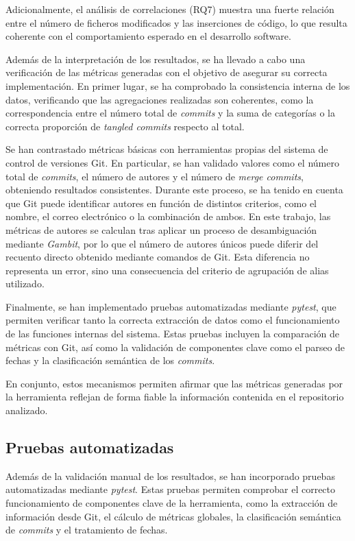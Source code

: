 \documentclass[a4paper, 12pt]{book}
\begin{document}
Adicionalmente, el análisis de correlaciones (RQ7) muestra una fuerte relación entre el número de ficheros modificados y las inserciones de código, lo que resulta coherente con el comportamiento esperado en el desarrollo software.

Además de la interpretación de los resultados, se ha llevado a cabo una verificación de las métricas generadas con el objetivo de asegurar su correcta implementación. En primer lugar, se ha comprobado la consistencia interna de los datos, verificando que las agregaciones realizadas son coherentes, como la correspondencia entre el número total de \emph{commits} y la suma de categorías o la correcta proporción de \emph{tangled commits} respecto al total.

Se han contrastado métricas básicas con herramientas propias del sistema de control de versiones Git. En particular, se han validado valores como el número total de \emph{commits}, el número de autores y el número de \emph{merge commits}, obteniendo resultados consistentes. Durante este proceso, se ha tenido en cuenta que Git puede identificar autores en función de distintos criterios, como el nombre, el correo electrónico o la combinación de ambos. En este trabajo, las métricas de autores se calculan tras aplicar un proceso de desambiguación mediante \emph{Gambit}, por lo que el número de autores únicos puede diferir del recuento directo obtenido mediante comandos de Git. Esta diferencia no representa un error, sino una consecuencia del criterio de agrupación de alias utilizado.

Finalmente, se han implementado pruebas automatizadas mediante \emph{pytest}, que permiten verificar tanto la correcta extracción de datos como el funcionamiento de las funciones internas del sistema. Estas pruebas incluyen la comparación de métricas con Git, así como la validación de componentes clave como el parseo de fechas y la clasificación semántica de los \emph{commits}.

En conjunto, estos mecanismos permiten afirmar que las métricas generadas por la herramienta reflejan de forma fiable la información contenida en el repositorio analizado.
\subsection{Pruebas automatizadas}
\label{subsec:pruebas_automatizadas}

Además de la validación manual de los resultados, se han incorporado pruebas automatizadas mediante \emph{pytest}. Estas pruebas permiten comprobar el correcto funcionamiento de componentes clave de la herramienta, como la extracción de información desde Git, el cálculo de métricas globales, la clasificación semántica de \emph{commits} y el tratamiento de fechas.
\end{document}
